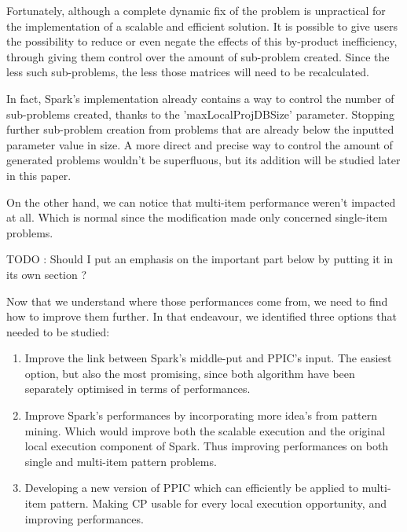 \documentclass{eplmastersthesis}
\begin{document}
\begin{enumerate}
Fortunately, although a complete dynamic fix of the problem is unpractical for the implementation of a scalable and efficient solution. It is possible to give users the possibility to reduce or even negate the effects of this by-product inefficiency, through giving them control over the amount of sub-problem created. Since the less such sub-problems, the less those matrices will need to be recalculated. \newline

In fact, Spark's implementation already contains a way to control the number of sub-problems created, thanks to the 'maxLocalProjDBSize' parameter. Stopping further sub-problem creation from problems that are already below the inputted parameter value in size. A more direct and precise way to control the amount of generated problems wouldn't be superfluous, but its addition will be studied later in this paper.

\end{enumerate}

On the other hand, we can notice that multi-item performance weren't impacted at all. Which is normal since the modification made only concerned single-item problems. \newline

TODO : Should I put an emphasis on the important part below by putting it in its own section ? \newline

Now that we understand where those performances come from, we need to find how to improve them further. In that endeavour, we identified three options that needed to be studied:

\begin{enumerate}
	\item Improve the link between Spark's middle-put and PPIC's input. The easiest option, but also the most promising, since both algorithm have been separately optimised in terms of performances.
	\item Improve Spark's performances by incorporating more idea's from pattern mining.
Which would improve both the scalable execution and the original local execution component of Spark. Thus improving performances on both single and multi-item pattern problems.
	\item Developing a new version of PPIC which can efficiently be applied to multi-item pattern. Making CP usable for every local execution opportunity, and improving performances.
\end{enumerate}
\end{document}
